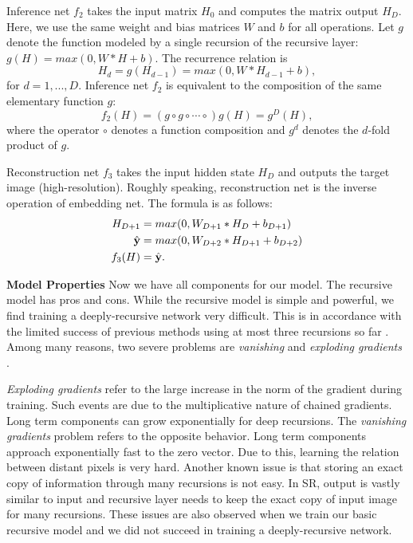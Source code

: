 \documentclass[10pt,twocolumn,letterpaper]{article}
\begin{document}
Inference net $f_2$ takes the input matrix $H_0$ and computes the matrix output $H_{D}$. Here, we use the same weight and bias matrices $W$ and $b$ for all operations.  Let $g$ denote the function modeled by a single recursion of the recursive layer: $g(H)=max(0,W*H+b)$. The recurrence relation is  
\begin{equation}
 H_d = g(H_{d-1}) = max(0,W*H_{d-1}+b),
\end{equation}
for $d = 1, ..., D$. 
Inference net $f_2$ is equivalent to the composition of the same elementary function $g$: 
\begin{equation}
f_2(H) = (g \circ g \circ \cdots \circ) g(H) =  g^{D}(H),
\end{equation}
where the operator $\circ$ denotes a function composition and $g^{d}$ denotes the $d$-fold product of $g$.

Reconstruction net $f_3$ takes the input hidden state $H_D$ and outputs the target image (high-resolution). Roughly speaking, reconstruction net is the inverse operation of embedding net. The formula is as follows:
\begin{align}
	H_{D+1} &= max(0, W_{D+1}*H_D + b_{D+1})\\
	\hat{{\bf y}} &= max(0, W_{D+2}*H_{D+1} + b_{D+2})\\
	f_3(H) &= \hat{{\bf y}}.
\end{align}

\textbf{Model Properties} Now we have all components for our model. The recursive model has pros and cons. While the recursive model is simple and powerful, we find training a deeply-recursive network very difficult. This is in accordance with the limited success of previous methods using at most three recursions so far \cite{Liang_2015_CVPR}.  Among many reasons, two severe problems are \textit{vanishing} and \textit{exploding gradients} \cite{bengio1994learning, pascanu2013difficulty}.  

\textit{Exploding gradients} refer to the large increase in the norm
of the gradient during training. Such events are due to
the multiplicative nature of chained gradients. Long term components can grow exponentially for deep recursions. The
\textit{vanishing gradients} problem refers to the opposite behavior. Long term components approach exponentially
fast to the zero vector. Due to this, learning the relation between distant pixels is very hard. Another known issue is that storing an exact copy of information through many recursions is not easy. In SR, output is vastly similar to input and recursive layer needs to keep the exact copy of input image for many recursions. These issues are also observed when we train our basic recursive model and we did not succeed in training a deeply-recursive network. 
\end{document}
